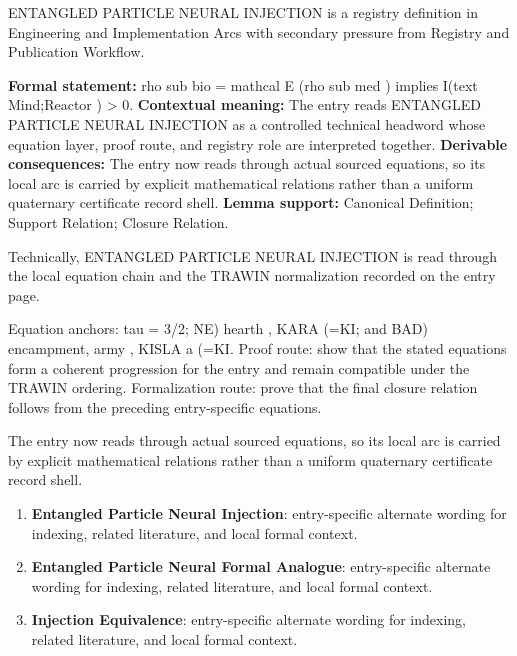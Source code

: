 
\begingroup\small
{}
ENTANGLED PARTICLE NEURAL INJECTION is a registry definition in Engineering and Implementation Arcs with secondary pressure from Registry and Publication Workflow.

\begingroup\footnotesize\setlength{\emergencystretch}{3em}\sloppy
\textbf{Formal statement:} rho sub bio = mathcal E (rho sub med ) implies I(text Mind;Reactor ) > 0. \textbf{Contextual meaning:} The entry reads ENTANGLED PARTICLE NEURAL INJECTION as a controlled technical headword whose equation layer, proof route, and registry role are interpreted together. \textbf{Derivable consequences:} The entry now reads through actual sourced equations, so its local arc is carried by explicit mathematical relations rather than a uniform quaternary certificate record shell. \textbf{Lemma support:} Canonical Definition; Support Relation; Closure Relation.\par
\endgroup

Technically, ENTANGLED PARTICLE NEURAL INJECTION is read through the local equation chain and the TRAWIN normalization recorded on the entry page.

Equation anchors: tau = 3/2; NE) hearth , KARA  (=KI; and BAD) encampment, army , KISLA   a (=KI. Proof route: show that the stated equations form a coherent progression for the entry and remain compatible under the TRAWIN ordering. Formalization route: prove that the final closure relation follows from the preceding entry-specific equations.

The entry now reads through actual sourced equations, so its local arc is carried by explicit mathematical relations rather than a uniform quaternary certificate record shell.
\endgroup

\begin{enumerate}[leftmargin=1.6em,itemsep=6pt,topsep=4pt]
\item \textbf{Entangled Particle Neural Injection}: entry-specific alternate wording for indexing, related literature, and local formal context.
\item \textbf{Entangled Particle Neural Formal Analogue}: entry-specific alternate wording for indexing, related literature, and local formal context.
\item \textbf{Injection Equivalence}: entry-specific alternate wording for indexing, related literature, and local formal context.
\end{enumerate}

